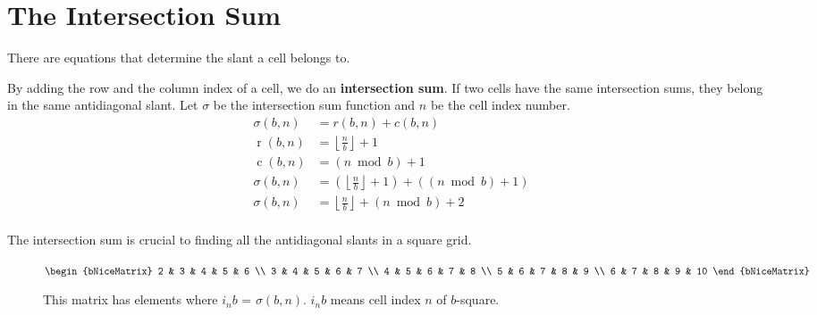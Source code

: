 \documentclass[twoside,openany,12pt]{book}
\begin{document}
    \section{The Intersection Sum} \label{intersection_sum}
    There are equations that determine the slant a cell belongs to.

    By adding the row and the column index of a cell, we do an \textbf{intersection sum}. If two cells have the same intersection sums, they belong in the same antidiagonal slant. Let $\sigma$ be the intersection sum function and $n$ be the cell index number.
    \begin{equation}
        \begin{split}
            \sigma(b,n) &= r(b,n) + c(b,n) \\
            \operatorname{r}(b,n) &= \left\lfloor \frac{n}{b} \right\rfloor + 1 \\
            \operatorname{c}(b,n) &= (n\bmod b) + 1 \\
            \sigma(b,n) &= ( \left\lfloor \frac{n}{b} \right\rfloor + 1 ) + ((n \bmod b) + 1)\\
            \sigma(b,n) &= \left\lfloor \frac{n}{b} \right\rfloor + (n \bmod b) + 2\\
        \end{split}
    \end{equation}

    The intersection sum is crucial to finding all the antidiagonal slants in a square grid.
    \begin{figure}[h]
        \centering
        {$
        \begin{bNiceMatrix}
            2 & 3 & 4 & 5 & 6 \\
            3 & 4 & 5 & 6 & 7 \\
            4 & 5 & 6 & 7 & 8 \\
            5 & 6 & 7 & 8 & 9 \\
            6 & 7 & 8 & 9 & 10
        \end{bNiceMatrix}
        $}
        \caption{This matrix has elements where $i_{n}b$ = $\sigma(b,n)$. $i_{n}b$ means cell index $n$ of $b$-square.}
    \end{figure}
\end{document}
